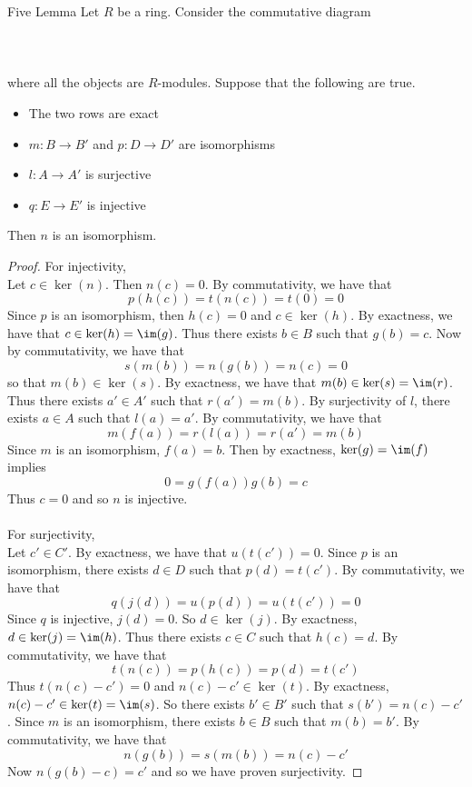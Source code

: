 \documentclass[a4paper]{article}
\begin{document}
\begin{lmm}{Five Lemma}{} Let $R$ be a ring. Consider the commutative diagram \\~\\
\\~\\
where all the objects are $R$-modules. Suppose that the following are true. 
\begin{itemize}
\item The two rows are exact
\item $m:B\to B'$ and $p:D\to D'$ are isomorphisms
\item $l:A\to A'$ is surjective
\item $q:E\to E'$ is injective
\end{itemize}
Then $n$ is an isomorphism. 
\begin{proof}
For injectivity, \\
Let $c\in\ker(n)$. Then $n(c)=0$. By commutativity, we have that $$p(h(c))=t(n(c))=t(0)=0$$ Since $p$ is an isomorphism, then $h(c)=0$ and $c\in\ker(h)$. By exactness, we have that $c\in\ker(h)=\im(g)$. Thus there exists $b\in B$ such that $g(b)=c$. Now by commutativity, we have that $$s(m(b))=n(g(b))=n(c)=0$$ so that $m(b)\in\ker(s)$. By exactness, we have that $m(b)\in\ker(s)=\im(r)$. Thus there exists $a'\in A'$ such that $r(a')=m(b)$. By surjectivity of $l$, there exists $a\in A$ such that $l(a)=a'$. By commutativity, we have that $$m(f(a))=r(l(a))=r(a')=m(b)$$ Since $m$ is an isomorphism, $f(a)=b$. Then by exactness, $\ker(g)=\im(f)$ implies $$0=g(f(a))g(b)=c$$ Thus $c=0$ and so $n$ is injective. \\~\\

For surjectivity, \\
Let $c'\in C'$. By exactness, we have that $u(t(c'))=0$. Since $p$ is an isomorphism, there exists $d\in D$ such that $p(d)=t(c')$. By commutativity, we have that $$q(j(d))=u(p(d))=u(t(c'))=0$$ Since $q$ is injective, $j(d)=0$. So $d\in\ker(j)$. By exactness, $d\in\ker(j)=\im(h)$. Thus there exists $c\in C$ such that $h(c)=d$. By commutativity, we have that $$t(n(c))=p(h(c))=p(d)=t(c')$$ Thus $t(n(c)-c')=0$ and $n(c)-c'\in\ker(t)$. By exactness, $n(c)-c'\in\ker(t)=\im(s)$. So there exists $b'\in B'$ such that $s(b')=n(c)-c'$. Since $m$ is an isomorphism, there exists $b\in B$ such that $m(b)=b'$. By commutativity, we have that $$n(g(b))=s(m(b))=n(c)-c'$$ Now $n(g(b)-c)=c'$ and so we have proven surjectivity. 
\end{proof}
\end{lmm}
\end{document}
